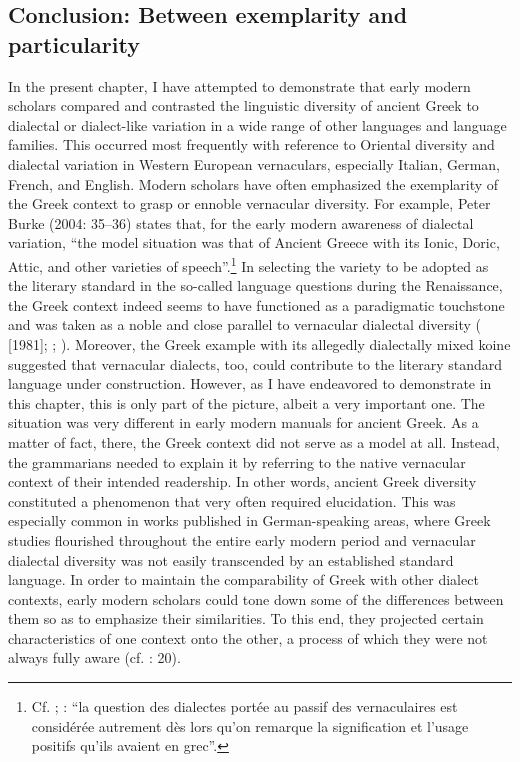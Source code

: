 \documentclass[output=paper]{langsci/langscibook}
\begin{document}
\subsection{Conclusion: Between exemplarity and particularity}
\hypertarget{Toc19704868}{}
In the present chapter, I have attempted to demonstrate that early modern scholars compared and contrasted the linguistic diversity of ancient Greek to dialectal or dialect-like variation in a wide range of other languages and language families. This occurred most frequently with reference to Oriental diversity and dialectal variation in Western European vernaculars, especially Italian, German, French, and English. Modern scholars have often emphasized the exemplarity of the Greek context to grasp or ennoble vernacular diversity. For example, Peter Burke (2004: 35–36) states that, for the early modern awareness of dialectal variation, “the model situation was that of Ancient Greece with its Ionic, Doric, Attic, and other varieties of speech”.\footnote{Cf. \citet[923]{Haugen1966}; \citet[216]{Giard1992}: “la question des dialectes portée au passif des vernaculaires est considérée autrement dès lors qu’on remarque la signification et l’usage positifs qu’ils avaient en grec”.} In selecting the variety to be adopted as the literary standard in the so-called language questions during the Renaissance, the Greek context indeed seems to have functioned as a paradigmatic touchstone and was taken as a noble and close parallel to vernacular dialectal diversity (\citealt{Alinei1984} [1981]; \citealt{Trovato1984}; \citealt{Trapp1990}). Moreover, the Greek example with its allegedly dialectally mixed koine suggested that vernacular dialects, too, could contribute to the literary standard language under construction. However, as I have endeavored to demonstrate in this chapter, this is only part of the picture, albeit a very important one. The situation was very different in early modern manuals for ancient Greek. As a matter of fact, there, the Greek context did not serve as a model at all. Instead, the grammarians needed to explain it by referring to the native vernacular context of their intended readership. In other words, ancient Greek diversity constituted a phenomenon that very often required elucidation. This was especially common in works published in German-speaking areas, where Greek studies flourished throughout the entire early modern period and vernacular dialectal diversity was not easily transcended by an established standard language. In order to maintain the comparability of Greek with other dialect contexts, early modern scholars could tone down some of the differences between them so as to emphasize their similarities. To this end, they projected certain characteristics of one context onto the other, a process of which they were not always fully aware (cf. \citealt{Alinei1980}: 20).
\end{document}
